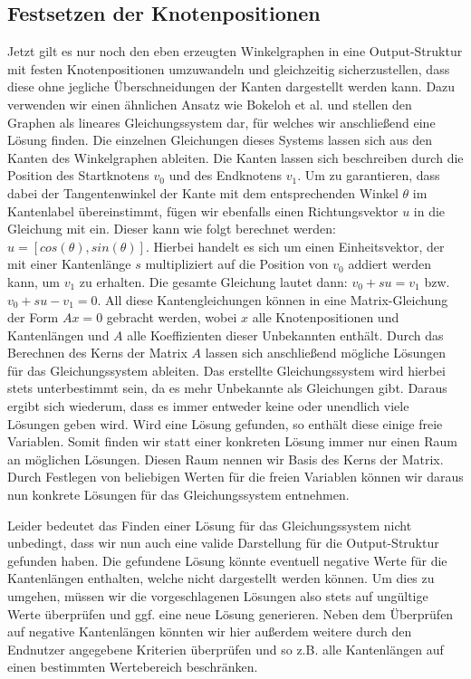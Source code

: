 \subsection{Festsetzen der Knotenpositionen}
Jetzt gilt es nur noch den eben erzeugten Winkelgraphen in eine Output-Struktur mit festen Knotenpositionen umzuwandeln und gleichzeitig sicherzustellen,
dass diese ohne jegliche Überschneidungen der Kanten dargestellt werden kann. Dazu verwenden wir einen ähnlichen Ansatz wie Bokeloh et al. \cite{4_bokeloh_et_al}
und stellen den Graphen als lineares Gleichungssystem dar, für welches wir anschließend eine Lösung finden. Die einzelnen Gleichungen dieses Systems lassen
sich aus den Kanten des Winkelgraphen ableiten. Die Kanten lassen sich beschreiben durch die Position des Startknotens \(v_0\) und des Endknotens \(v_1\).
Um zu garantieren, dass dabei der Tangentenwinkel der Kante mit dem entsprechenden Winkel \(\theta\) im Kantenlabel übereinstimmt, fügen wir ebenfalls einen
Richtungsvektor \(u\) in die Gleichung mit ein. Dieser kann wie folgt berechnet werden: \(u = [cos(\theta), sin(\theta)]\). Hierbei handelt es sich um einen
Einheitsvektor, der mit einer Kantenlänge \(s\) multipliziert auf die Position von \(v_0\) addiert werden kann, um \(v_1\) zu erhalten. Die gesamte Gleichung
lautet dann: \(v_0 + su = v_1\) bzw. \(v_0 + su - v_1 = 0\). All diese Kantengleichungen können in eine Matrix-Gleichung der Form \(Ax = 0\) gebracht werden,
wobei \(x\) alle Knotenpositionen und Kantenlängen und \(A\) alle Koeffizienten dieser Unbekannten enthält. Durch das Berechnen des Kerns der Matrix \(A\)
lassen sich anschließend mögliche Lösungen für das Gleichungssystem ableiten. Das erstellte Gleichungssystem wird hierbei stets unterbestimmt sein, da es
mehr Unbekannte als Gleichungen gibt. Daraus ergibt sich wiederum, dass es immer entweder keine oder unendlich viele Lösungen geben wird. Wird eine Lösung
gefunden, so enthält diese einige freie Variablen. Somit finden wir statt einer konkreten Lösung immer nur einen Raum an möglichen Lösungen. Diesen Raum
nennen wir Basis des Kerns der Matrix. Durch Festlegen von beliebigen Werten für die freien Variablen können wir daraus nun konkrete Lösungen für das Gleichungssystem
entnehmen. %

Leider bedeutet das Finden einer Lösung für das Gleichungssystem nicht unbedingt, dass wir nun auch eine valide Darstellung für die Output-Struktur
gefunden haben. Die gefundene Lösung könnte eventuell negative Werte für die Kantenlängen enthalten, welche nicht dargestellt werden können. Um dies zu umgehen,
müssen wir die vorgeschlagenen Lösungen also stets auf ungültige Werte überprüfen und ggf. eine neue Lösung generieren. Neben dem Überprüfen auf negative
Kantenlängen könnten wir hier außerdem weitere durch den Endnutzer angegebene Kriterien überprüfen und so z.B. alle Kantenlängen auf einen bestimmten Wertebereich
beschränken.


